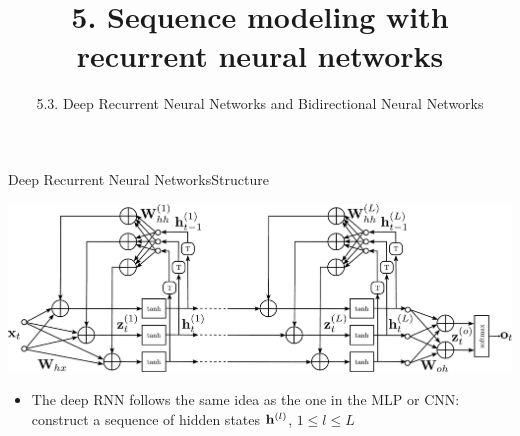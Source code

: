 \documentclass{beamer}
\title[5. Recurrent neural networks]{5. Sequence modeling with recurrent neural networks}
\subtitle{5.3. Deep Recurrent Neural Networks and Bidirectional Neural Networks}
\begin{document}
\maketitle

\begin{frame}{Deep Recurrent Neural Networks}{Structure}
\begin{center}
\includegraphics[scale=0.23]{Module 5 (RNN)/pics/deep_rnn_rolled.pdf}
\end{center}
\begin{itemize}
\item The deep RNN follows the same idea as the one in the MLP or CNN: construct a sequence of hidden states ${\bf h}^{(l)}$, $1 \leq l \leq L$ 
\end{itemize}
\end{frame}
\end{document}
